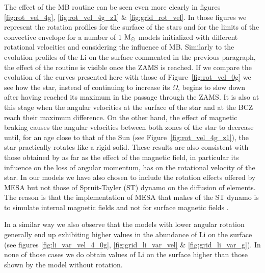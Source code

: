 \documentclass[fleqn,usenatbib]{mnras}
\begin{document}
{{The effect of the MB routine can be seen even more clearly in figures \ref{fig:rot_vel_4g}, \ref{fig:rot_vel_4g_z1} \& \ref{fig:grid_rot_vel}. In those figures we represent the rotation profiles for the surface of the stars and for the limits of the convective envelope for a number of 1 $\mathrm{M}_\odot$ models initialized with different rotational velocities and considering the influence of MB. Similarly to the evolution profiles of the Li on the surface commented in the previous paragraph, the effect of the routine is visible once the ZAMS is reached. If we compare the evolution of the curves presented here with those of Figure~\ref{fig:rot_vel_0g} we see how the star, instead of continuing to increase its $\Omega$, begins to slow down after having reached its maximum in the passage through the ZAMS. It is also at this stage when the angular velocities at the surface of the star and at the BCZ reach their maximum difference. On the other hand, the effect of magnetic braking causes the angular velocities between both zones of the star to decrease until, for an age close to that of the Sun (see Figure~\ref{fig:rot_vel_4g_z1}), the star practically rotates like a rigid solid. These results are also consistent with those obtained by \citet{Eggenberger2010} as far as the effect of the magnetic field, in particular its influence on the loss of angular momentum, has on the rotational velocity of the star. In our models we have also chosen to include the rotation effects offered by MESA but not those of Spruit-Tayler (ST) dynamo on the diffusion of elements. The reason is that the implementation of MESA that makes of the ST dynamo is to simulate internal magnetic fields and not for surface magnetic fields \citep{Paxton2013}.

In a similar way we also observe that the models with lower angular rotation generally end up exhibiting higher values in the abundance of Li on the surface (see figures \ref{fig:li_var_vel_4_0g}, \ref{fig:grid_li_var_vel} \& \ref{fig:grid_li_var_g}). In none of those cases we do obtain values of Li on the surface higher than those shown by the model without rotation.\par

}}
\end{document}
